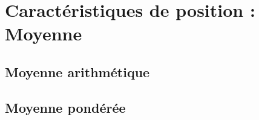 \section{Caractéristiques de position : Moyenne}
\subsection{Moyenne arithmétique}



\subsection{Moyenne pond\'er\'ee}


